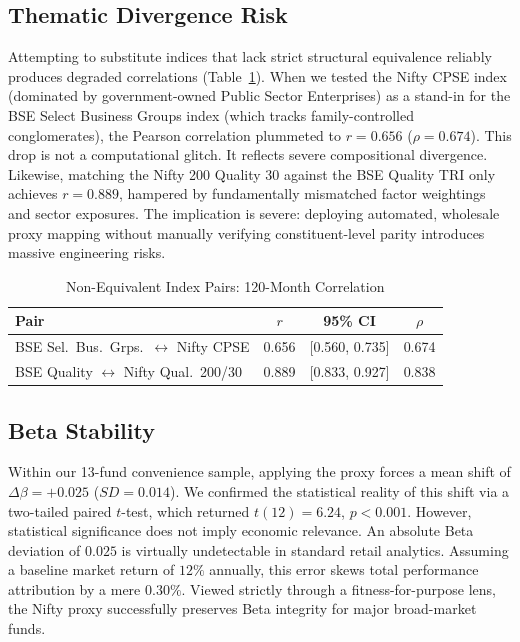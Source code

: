 \documentclass[conference]{IEEEtran}
\begin{document}
\subsection{Thematic Divergence Risk}
Attempting to substitute indices that lack strict structural equivalence reliably produces degraded correlations (Table~\ref{tab:thematic}). When we tested the Nifty CPSE index (dominated by government-owned Public Sector Enterprises) as a stand-in for the BSE Select Business Groups index (which tracks family-controlled conglomerates), the Pearson correlation plummeted to $r=0.656$ ($\rho=0.674$). This drop is not a computational glitch. It reflects severe compositional divergence. Likewise, matching the Nifty 200 Quality 30 against the BSE Quality TRI only achieves $r=0.889$, hampered by fundamentally mismatched factor weightings and sector exposures. The implication is severe: deploying automated, wholesale proxy mapping without manually verifying constituent-level parity introduces massive engineering risks.

\begin{table}[htbp]
\caption{Non-Equivalent Index Pairs: 120-Month Correlation}
\begin{center}
\footnotesize
\setlength{\tabcolsep}{3pt}
\begin{tabular}{lccc}
\toprule
\textbf{Pair} & \textbf{$r$} & \textbf{95\% CI} & \textbf{$\rho$} \\
\midrule
BSE Sel.\ Bus.\ Grps.\ $\leftrightarrow$ Nifty CPSE & 0.656 & [0.560, 0.735] & 0.674 \\
BSE Quality $\leftrightarrow$ Nifty Qual.\ 200/30 & 0.889 & [0.833, 0.927] & 0.838 \\
\bottomrule
\end{tabular}
\label{tab:thematic}
\end{center}
\end{table}

\subsection{Beta Stability}
Within our 13-fund convenience sample, applying the proxy forces a mean shift of $\Delta\beta=+0.025$ ($SD=0.014$). We confirmed the statistical reality of this shift via a two-tailed paired $t$-test, which returned $t(12)=6.24$, $p<0.001$. However, statistical significance does not imply economic relevance. An absolute Beta deviation of $0.025$ is virtually undetectable in standard retail analytics. Assuming a baseline market return of $12\%$ annually, this error skews total performance attribution by a mere $0.30\%$. Viewed strictly through a fitness-for-purpose lens, the Nifty proxy successfully preserves Beta integrity for major broad-market funds.
\end{document}
